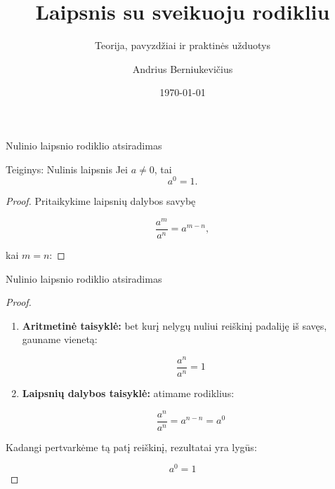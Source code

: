 \documentclass[aspectratio=169,10pt]{beamer}
\title[Laipsnis su sveikuoju rodikliu]
{Laipsnis su sveikuoju rodikliu}
\subtitle{Teorija, pavyzdžiai ir praktinės užduotys}
\author[A. Berniukevičius]{Andrius Berniukevičius}
\date{\today}
\newenvironment{proposition}[1][]%
{\begin{block}{Teiginys: #1}}%
{\end{block}}
\begin{document}

\begin{frame}
    \titlepage
\end{frame}


\begin{frame}{Nulinio laipsnio rodiklio atsiradimas}

    \begin{proposition}[Nulinis laipsnis]
        Jei $a \neq 0$, tai
        \[
        a^0 = 1.
        \]
    \end{proposition}

    \begin{proof}

        Pritaikykime laipsnių dalybos savybę

        \[
        \frac{a^m}{a^n}=a^{m-n},
        \]

        kai $m=n$:

    \end{proof}

\end{frame}

\begin{frame}{Nulinio laipsnio rodiklio atsiradimas}

    \begin{proof}

        \begin{enumerate}

            \item
            \textbf{Aritmetinė taisyklė:}
            bet kurį nelygų nuliui reiškinį padaliję iš savęs,
            gauname vienetą:

            \[
            \frac{a^n}{a^n}=1
            \]

            \item
            \textbf{Laipsnių dalybos taisyklė:}
            atimame rodiklius:

            \[
            \frac{a^n}{a^n}
            =
            a^{n-n}
            =
            a^0
            \]

        \end{enumerate}

        Kadangi pertvarkėme tą patį reiškinį,
        rezultatai yra lygūs:

        \[
        a^0=1
        \]

    \end{proof}

\end{frame}
\end{document}
